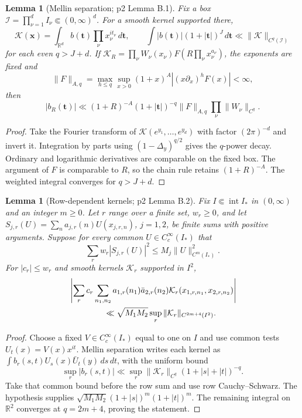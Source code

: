 \documentclass[11pt,a4paper]{article}
\numberwithin{equation}{section}
\newtheorem{lemma}[theorem]{Lemma}
\theoremstyle{definition}
\theoremstyle{remark}
\newcommand{\R}{\mathbb R}
\newcommand{\dd}{\,d}
\begin{document}
\begin{lemma}[Mellin separation; p2 Lemma B.1]\label{lem:separation}
Fix a box $\mathcal I=\prod_{\nu=1}^d I_\nu\Subset(0,\infty)^d$. For a smooth kernel supported there,
\[
 \mathcal K(\boldsymbol x)=\int_{\R^d}b(\boldsymbol t)
                 \prod_\nu x_\nu^{it_\nu}\dd\boldsymbol t,\qquad
 \int|b(\boldsymbol t)|(1+|\boldsymbol t|)^J\dd\boldsymbol t
                    \ll\|\mathcal K\|_{C^q(\mathcal I)}
\]
for each even $q>J+d$. If
$\mathcal K_R=\prod_\nu W_\nu(x_\nu)F(R\prod_\nu x_\nu^{a_\nu})$,
the exponents are fixed and
\[
 \|F\|_{A,q}=\max_{h\le q}\sup_{x>0}
            (1+x)^A|(x\partial_x)^hF(x)|<\infty,
\]
then
\[
 |b_R(\boldsymbol t)|\ll(1+R)^{-A}(1+|\boldsymbol t|)^{-q}
                 \|F\|_{A,q}\prod_\nu\|W_\nu\|_{C^q}.
\]
\end{lemma}
\begin{proof}
Take the Fourier transform of $\mathcal K(e^{y_1},\ldots,e^{y_d})$ with factor $(2\pi)^{-d}$ and invert it. Integration by parts using $(1-\Delta_y)^{q/2}$ gives the $q$-power decay. Ordinary and logarithmic derivatives are comparable on the fixed box. The argument of $F$ is comparable to $R$, so the chain rule retains $(1+R)^{-A}$. The weighted integral converges for $q>J+d$.
\end{proof}

\begin{lemma}[Row-dependent kernels; p2 Lemma B.2]\label{lem:rowkernel}
Fix $I\Subset\operatorname{int}I_*$ in $(0,\infty)$ and an integer $m\ge0$. Let $r$ range over a finite set, $w_r\ge0$, and let
$S_{j,r}(U)=\sum_na_{j,r}(n)U(x_{j,r,n})$, $j=1,2$, be finite sums with positive arguments. Suppose for every common $U\in C_c^\infty(I_*)$ that
\[
 \sum_rw_r|S_{j,r}(U)|^2\le M_j\|U\|_{C^m(I_*)}^2 .
\]
For $|c_r|\le w_r$ and smooth kernels $\mathcal K_r$ supported in $I^2$,
\begin{align*}
 &\left|\sum_rc_r\sum_{n_1,n_2}a_{1,r}(n_1)\bar a_{2,r}(n_2)
      \mathcal K_r(x_{1,r,n_1},x_{2,r,n_2})\right|\\
 &\hspace{15mm}\ll\sqrt{M_1M_2}\sup_r
                                      \|\mathcal K_r\|_{C^{2m+4}(I^2)} .
\end{align*}
\end{lemma}
\begin{proof}
Choose a fixed $V\in C_c^\infty(I_*)$ equal to one on $I$ and use common tests $U_t(x)=V(x)x^{it}$. Mellin separation writes each kernel as
$\int b_r(s,t)U_s(x)\bar U_t(y)\dd s\dd t$, with the uniform bound
\[
 \sup_r|b_r(s,t)|\ll
 \sup_r\|\mathcal K_r\|_{C^q}(1+|s|+|t|)^{-q}.
\]
Take that common bound before the row sum and use row Cauchy--Schwarz. The hypothesis supplies $\sqrt{M_1M_2}(1+|s|)^m(1+|t|)^m$. The remaining integral on $\R^2$ converges at $q=2m+4$, proving the statement.
\end{proof}
\end{document}
